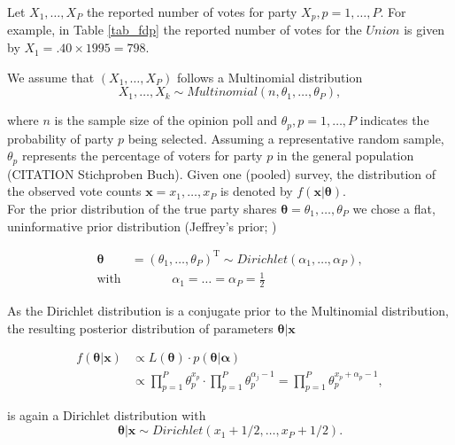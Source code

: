 \documentclass[smallcondensed]{svjour3}     %
\newcommand{\T}{\mathrm{\scriptscriptstyle T}}
\begin{document}
Let $X_1,\ldots, X_P$ the reported number of votes for party
$X_p, p=1,\ldots,P$. For example, in Table \ref{tab_fdp} the reported
number of votes for the $Union$ is given by $X_1 = .40 \times 1995 = 798$.

We assume that $(X_1, \ldots, X_P)$ follows a Multinomial distribution
\begin{equation}\label{eq:multinom}
X_1,\ldots, X_k \sim Multinomial(n, \theta_1,\ldots, \theta_P),
\end{equation}

where $n$ is the sample size of the opinion poll and $\theta_p, p=1,\ldots,P$
indicates the probability of party $p$ being selected. Assuming a representative
random sample, $\theta_p$ represents the percentage of voters for party $p$ in
the general population (CITATION Stichproben Buch). Given one (pooled) survey,
the distribution of the observed vote counts $\mathbf{x}=x_1,\ldots,x_P$ is
denoted by $f(\mathbf{x}|\boldsymbol{\theta})$.\\

For the prior distribution of the true party shares $\boldsymbol{\theta}=\theta_1,\ldots, \theta_P$
we chose a flat, uninformative prior distribution
(Jeffrey's prior; \citet{gelman_2013})

\begin{equation}
\begin{aligned}
\boldsymbol{\theta} &= (\theta_1,\ldots,\theta_P)^\T \sim Dirichlet(\alpha_1,\ldots,\alpha_P), \\
\text{with} &\ \ \ \ \ \ \ \ \ \ \ \ \ \ \ \alpha_1 = \ldots = \alpha_P = \frac{1}{2}
\end{aligned}
\end{equation}

As the Dirichlet distribution is a conjugate prior to the Multinomial distribution,
the resulting posterior distribution of parameters $\boldsymbol{\theta}|\mathbf{x}$

\begin{align}
f(\boldsymbol{\theta}|\mathbf{x})
  & \propto L(\boldsymbol{\theta})\cdot p(\boldsymbol{\theta}|\boldsymbol{\alpha})\\
  & \propto \prod_{p=1}^{P}\theta_p^{x_p}\cdot \prod_{p=1}^{P}\theta_p^{\alpha_{j}-1} = \prod_{p=1}^{P}\theta_p^{x_p + \alpha_p-1},
\end{align}

is again a Dirichlet distribution with
\begin{equation}\label{eq:posterior}
\boldsymbol{\theta}|\mathbf{x} \sim Dirichlet(x_1 + 1/2,\ldots, x_P + 1/2).
\end{equation}
\end{document}
